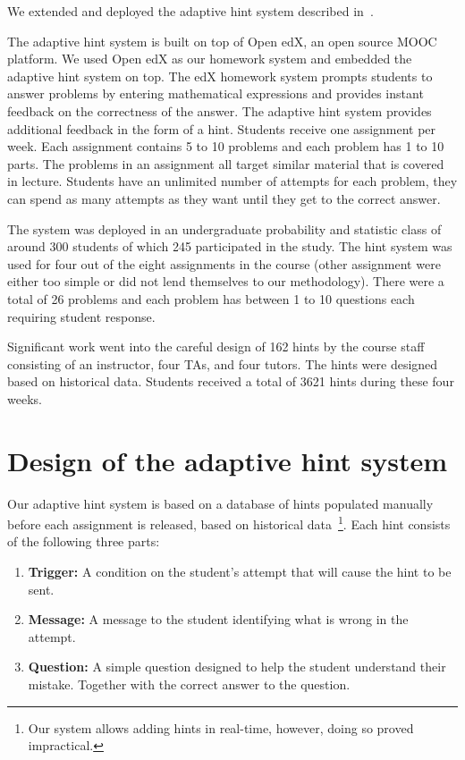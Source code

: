 \documentclass{llncs2e/llncs}
\begin{document}
We extended and deployed the adaptive hint system described in~\cite{ElkherjFreund14}.

The adaptive hint system is built on top of Open edX, an open source MOOC platform. We used Open edX as our homework system and embedded the adaptive hint system on top. The edX homework system prompts students to answer problems by entering mathematical expressions and provides instant feedback on the correctness of the answer. The adaptive hint system provides additional feedback in the form of a hint. Students receive one assignment per week. Each assignment contains 5 to 10 problems and each problem has 1 to 10 parts. The problems in an assignment all target similar material that is covered in lecture. Students have an unlimited number of attempts for each problem, they can spend as many attempts as they want until they get to the correct answer.

The system was deployed in an undergraduate probability and statistic class of around 300 students of which 245 participated in the study. The hint system was used for four out of the eight assignments in the course (other assignment were either too simple or did not lend themselves to our methodology). There were a total of 26 problems and each problem has between 1 to 10 questions each requiring student response.

Significant work went into the careful design of 162 hints by the course staff consisting of an instructor, four TAs, and four tutors. The hints were designed based on historical data. Students received a total of 3621 hints during these four weeks.

\section{Design of the adaptive hint system}

Our adaptive hint system is based on a database of hints populated manually before each assignment is released, based on historical data~\footnote{Our system allows adding hints in real-time, however, doing so proved impractical.}. Each hint consists of the following three parts:
\begin{enumerate}
\item {\bf Trigger:} A condition on the student's attempt that will cause the hint to be sent.
\item {\bf Message:} A message to the student identifying what is wrong in the attempt.
\item {\bf Question:} A simple question designed to help the student understand their mistake. Together with the correct answer to the question.   
\end{enumerate}
\end{document}
